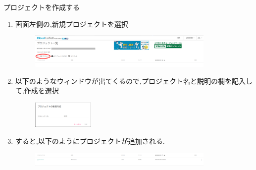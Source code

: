 \documentclass[dvipdfmx]{beamer}
\begin{document}
  \begin{frame}{プロジェクトを作成する}
    \begin{enumerate}
      \item {\scriptsize 画面左側の,新規プロジェクトを選択}
            \begin{figure}[h]
              \centering
              \includegraphics[width=9cm]{images/CreateProject1.png}
            \end{figure}
      \item {\scriptsize 以下のようなウィンドウが出てくるので,プロジェクト名と説明の欄を記入して,作成を選択}
            \begin{figure}[h]
              \centering
              \includegraphics[width=3cm]{images/CreateProject2.png}
            \end{figure}
      \item {\scriptsize すると,以下のようにプロジェクトが追加される.}
            \begin{figure}[h]
              \centering
              \includegraphics[width=9cm]{images/CreateProject3.png}
            \end{figure}
    \end{enumerate}
  \end{frame}
\end{document}
